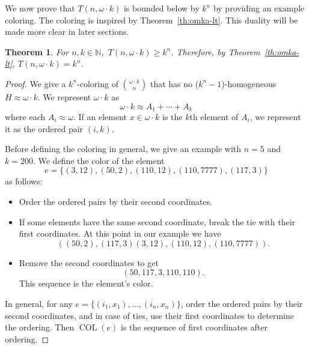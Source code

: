 \documentclass[10pt,a4paper]{article}
\newcommand{\om}{\omega}
\newcommand{\oequiv}{\approx}
\newcommand{\setconcat}{+}
\newcommand{\COL}{\operatorname{COL}}
\newcommand{\N}{\mathbb{N}}
\newcommand{\numpoints}{n}
\newcommand{\Commonconst}{A}
\theoremstyle{plain}
\newtheorem{theorem}{Theorem}[section]
\theoremstyle{definition}
\begin{document}
We now prove that $T(\numpoints, \omega \cdot k)$ is bounded below by $k^{\numpoints}$ by providing an example coloring. The coloring is inspired by Theorem~\ref{th:omka-lt}. This duality will be made more clear in later sections.

\begin{theorem}\label{th:omka-gt}
For $\numpoints,k \in \N$,~$T(\numpoints,\om \cdot k) \geq k^{\numpoints}$. Therefore, by Theorem~\ref{th:omka-lt}, $T(\numpoints,\om \cdot k) = k^{\numpoints}$.
\end{theorem}
\begin{proof}
We give a $k^{\numpoints}$-coloring of $\binom{\om \cdot k}{\numpoints}$ that has no ($k^{\numpoints}-1$)-homogeneous $H\oequiv \om\cdot k$.
We represent $\om \cdot k$ as
$$\om \cdot k \oequiv \Commonconst_1 \setconcat \cdots \setconcat \Commonconst_k$$
where each $\Commonconst_i \oequiv \om$.
If an element $x \in \om \cdot k$ is the $k$th element of $\Commonconst_i$, we represent it as the ordered pair $(i,k)$.

Before defining the coloring in general, we give an example with $\numpoints=5$ and $k=200$. 
%
We define the color of the element
$$e=\{ (3,12), (50,2), (110,12), (110,7777), (117,3) \}$$
as follows:


\begin{itemize}
\item
Order the ordered pairs by their second coordinates.
\item
If some elements have the same second coordinate, break the tie with their first coordinates. At this point in our example we have
$$((50,2), (117,3) (3,12), (110,12), (110,7777)).$$
\item
Remove the second coordinates to get
$$(50,117,3,110,110).$$
This sequence is the element's color.
\end{itemize}


In general, for any $e=\{(i_1,x_1),\ldots,(i_{\numpoints},x_{\numpoints})\}$, order the ordered pairs by their second coordinates, and in case of ties, use their first coordinates to determine the ordering. Then
$\COL(e)$ is the sequence of first coordinates after ordering.


\end{proof}
\end{document}
